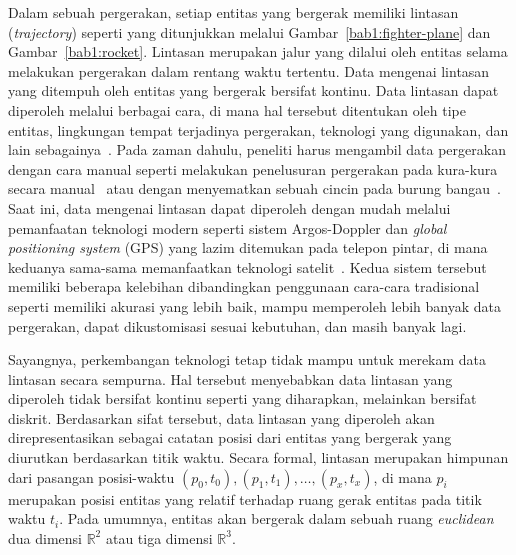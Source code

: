 Dalam sebuah pergerakan, setiap entitas yang bergerak memiliki lintasan (\textit{trajectory}) seperti yang ditunjukkan melalui Gambar~\ref{bab1:fighter-plane} dan Gambar~\ref{bab1:rocket}. Lintasan merupakan jalur yang dilalui oleh entitas selama melakukan pergerakan dalam rentang waktu tertentu. Data mengenai lintasan yang ditempuh oleh entitas yang bergerak bersifat kontinu. Data lintasan dapat diperoleh melalui berbagai cara, di mana hal tersebut ditentukan oleh tipe entitas, lingkungan tempat terjadinya pergerakan, teknologi yang digunakan, dan lain sebagainya~\cite{wiratma:trajectory}. Pada zaman dahulu, peneliti harus mengambil data pergerakan dengan cara manual seperti melakukan penelusuran pergerakan pada kura-kura secara manual~\cite{stickel:02:turtle} atau dengan menyematkan sebuah cincin pada burung bangau~\cite{velden:01:cranes}. Saat ini, data mengenai lintasan dapat diperoleh dengan mudah melalui pemanfaatan teknologi modern seperti sistem Argos-Doppler dan \textit{global positioning system} (GPS) yang lazim ditemukan pada telepon pintar, di mana keduanya sama-sama memanfaatkan teknologi satelit~\cite{carter:argos}. Kedua sistem tersebut memiliki beberapa kelebihan dibandingkan penggunaan cara-cara tradisional seperti memiliki akurasi yang lebih baik, mampu memperoleh lebih banyak data pergerakan, dapat dikustomisasi sesuai kebutuhan, dan masih banyak lagi.



Sayangnya, perkembangan teknologi tetap tidak mampu untuk merekam data lintasan secara sempurna. Hal tersebut menyebabkan data lintasan yang diperoleh tidak bersifat kontinu seperti yang diharapkan, melainkan bersifat diskrit. Berdasarkan sifat tersebut, data lintasan yang diperoleh akan direpresentasikan sebagai catatan posisi dari entitas yang bergerak yang diurutkan berdasarkan titik waktu. Secara formal, lintasan merupakan himpunan dari pasangan posisi-waktu $(p_0, t_0), (p_1, t_1), \ldots, (p_x, t_x)$, di mana $p_i$ merupakan posisi entitas yang relatif terhadap ruang gerak entitas pada titik waktu $t_i$. Pada umumnya, entitas akan bergerak dalam sebuah ruang \textit{euclidean} dua dimensi $\mathbb{R}^2$ atau tiga dimensi $\mathbb{R}^3$.

